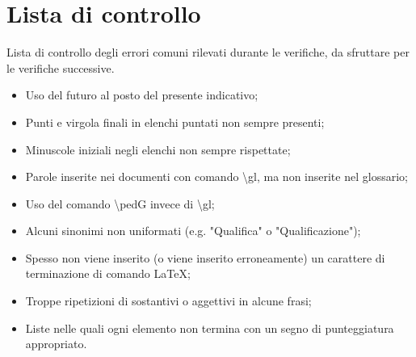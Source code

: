 \documentclass[../NormeDiProgetto.tex]{subfiles}
\begin{document}
	\section{Lista di controllo}
		Lista di controllo degli errori comuni rilevati durante le verifiche, da sfruttare per le verifiche
		successive.
		\begin{itemize}
			\item Uso del futuro al posto del presente indicativo;
			\item Punti e virgola finali in elenchi puntati non sempre presenti;
			\item Minuscole iniziali negli elenchi non sempre rispettate;
			\item Parole inserite nei documenti con comando \textbackslash gl, ma non inserite nel glossario;
			\item Uso del comando \textbackslash ped{G} invece di \textbackslash gl;
			\item Alcuni sinonimi non uniformati (e.g. "Qualifica" o "Qualificazione");
			\item Spesso non viene inserito (o viene inserito erroneamente) un carattere di terminazione di
			comando \LaTeX;
			\item Troppe ripetizioni di sostantivi o aggettivi in alcune frasi;
			\item Liste nelle quali ogni elemento non termina con un segno di punteggiatura appropriato.
		\end{itemize}
\end{document}
